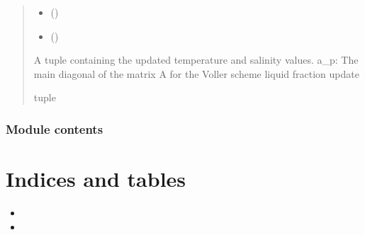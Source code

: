 \documentclass[a4paper,11pt,english,openany]{sphinxmanual}
\begin{document}
\begin{fulllineitems}
\begin{quote}
\begin{description}
\begin{itemize}
\item {} 
\sphinxAtStartPar
{} ()

\item {} 
\sphinxAtStartPar
{} ()

\end{itemize}

\sphinxAtStartPar
A tuple containing the updated temperature and salinity values.
a\_p: The main diagonal of the matrix A for the Voller scheme liquid fraction update

\sphinxAtStartPar
tuple

\end{description}\end{quote}

\end{fulllineitems}



\subsection{Module contents}
\label{\detokenize{api/spyice:module-src.spyice}}\label{\detokenize{api/spyice:module-contents}}

\chapter{Indices and tables}
\label{\detokenize{index:indices-and-tables}}\begin{itemize}
\item {} 
\sphinxAtStartPar
{}

\item {} 
\sphinxAtStartPar
{}

\end{itemize}
\end{document}
